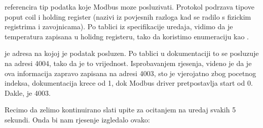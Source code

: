 \documentclass[letterpaper,10pt,croatian]{sphinxmanual}
\begin{document}
\sphinxAtStartPar
{} referencira tip podatka koje Modbus moze posluzivati. Protokol
podrzava tipove poput coil i holding register (nazivi iz povjesnih razloga kad
se radilo s fizickim registrima i zavojnicama). Po tablici iz specifikacije
uredaja, vidimo da je temperatura zapisana u holidng register\sphinxhyphen{}u, tako da
koristimo enumeraciju  kao
.

\sphinxAtStartPar
{} je adresa na kojoj je podatak posluzen. Po tablici u
dokumentaciji to se posluzuje na adresi 4004, tako da je to vrijednost.
Isprobavanjem rjesenja, videno je da je ova informacija zapravo zapisana na
adresi 4003, sto je vjerojatno zbog pocetnog indeksa, dokumentacija krece od 1,
dok Modbus driver pretpostavlja start od 0. Dakle,  je 4003.

\sphinxAtStartPar
Recimo da zelimo kontinuirano slati upite za ocitanjem na uredaj svakih 5
sekundi. Onda bi nam rjesenje izgledalo ovako:

\begin{sphinxVerbatim}[commandchars=\\\{\}]
    
 
 


  
       
         
     
           
         


 


   
\end{sphinxVerbatim}
\end{document}

